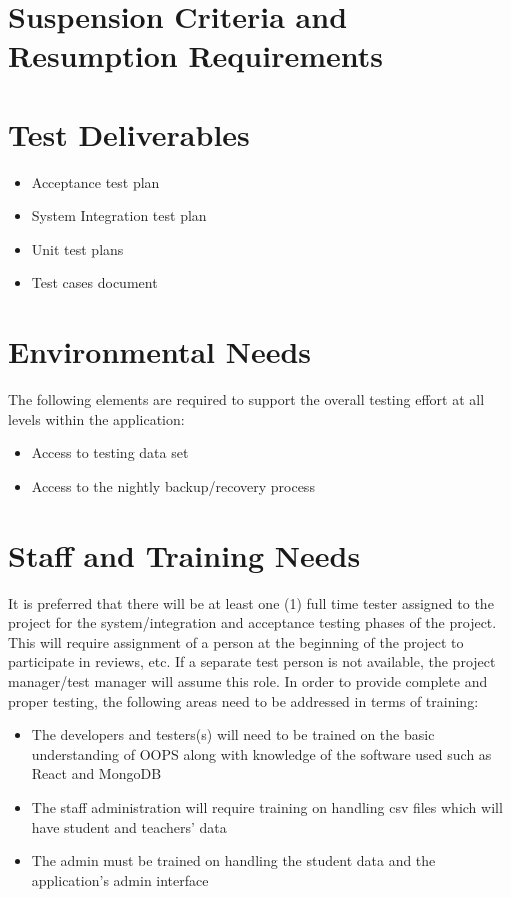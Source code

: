 \documentclass{scrreprt}
\begin{document}
\chapter{Suspension Criteria and Resumption Requirements}

\chapter{Test Deliverables}
\begin{itemize}
    \item Acceptance test plan
    \item System Integration test plan
    \item Unit test plans
    \item Test cases document
\end{itemize}

\chapter{Environmental Needs}
The following elements are required to support the overall testing effort at all levels within the application:
\begin{itemize}
    \item Access to testing data set 
    \item Access to the nightly backup/recovery process
\end{itemize}

\chapter{Staff and Training Needs}
It is preferred that there will be at least one (1) full time tester assigned to the project for the system/integration and acceptance testing phases of the project. This will require assignment of a person at the beginning of the project to participate in reviews, etc. If a separate test person is not available, the project manager/test manager will assume this role.
In order to provide complete and proper testing, the following areas need to be addressed in terms of training:
\begin{itemize}
    \item The developers and testers(s) will need to be trained on the basic understanding of OOPS along with knowledge of the software used such as React and MongoDB
    \item The staff administration will require training on handling csv files which will have student and teachers’ data
    \item The admin must be trained on handling the student data and the application’s admin interface
\end{itemize}
\end{document}
